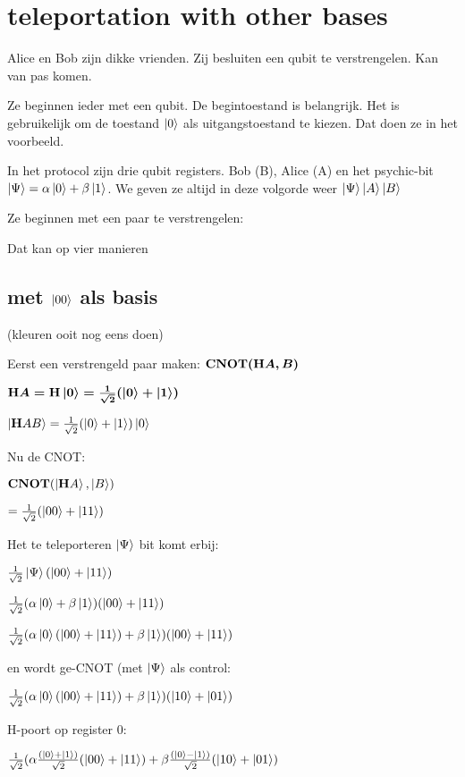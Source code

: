 \documentclass[../main.tex]{subfiles}
\begin{document}
\onlyinsubfile{
\setcounter{chapter}{1}
}
\notinsubfile{}
\section*{teleportation with other bases}


Alice en Bob zijn dikke vrienden. Zij besluiten een qubit te verstrengelen. Kan van pas komen.

Ze beginnen ieder met een qubit. De begintoestand is belangrijk. Het is gebruikelijk om de toestand $\ket{0}$ als uitgangstoestand te kiezen. Dat doen ze in het voorbeeld.


In het protocol zijn drie qubit registers. Bob (B), Alice (A) en het psychic-bit $\ket{\Psi}=\alpha\ket{0}+\beta\ket{1}$. We geven ze altijd in deze volgorde weer $\ket{\Psi }\ket{A}\ket{B}$

Ze beginnen met een paar te verstrengelen:

Dat kan op vier manieren
 
\subsection*{met $\ket{00}$ als basis}

(kleuren ooit nog eens doen)

Eerst een verstrengeld paar maken: $\port{CNOT}(\port{H}A, B)$

$\port{H}A=\port{H}\ket{0}=\frac{1}{\sqrt{2}}(\ket{0}+\ket{1})$

$\ket{\port{H}A B}= \frac{1}{\sqrt{2}}(\ket{0} +\ket{1})\ket{0}$

Nu de CNOT:

$\port{CNOT}(\ket{\port{H}A},\ket{ B})$

$= \frac{1}{\sqrt{2}}(\ket{00}+\ket{11})$

Het te teleporteren $\ket{\Psi}$ bit komt erbij:

$ \frac{1}{\sqrt{2}}\ket{\Psi}(\ket{00}+\ket{11})$


$ \frac{1}{\sqrt{2}}(\alpha\ket{0}+\beta\ket{1})(\ket{00}+\ket{11})$


$ \frac{1}{\sqrt{2}}(\alpha\ket{0}(\ket{00}+\ket{11})+\beta\ket{1})(\ket{00}+\ket{11})$

en wordt ge-CNOT (met $\ket{\Psi}$ als control:

$ \frac{1}{\sqrt{2}}(\alpha\ket{0}(\ket{00}+\ket{11})+\beta\ket{1})(\ket{10}+\ket{01})$

H-poort op register 0:

$ \frac{1}{\sqrt{2}}(\alpha\frac{(\ket{0}+\ket{1})}{\sqrt{2}}(\ket{00}+\ket{11})+\beta\frac{(\ket{0}-\ket{1})}{\sqrt{2}}(\ket{10}+\ket{01})$
\end{document}
